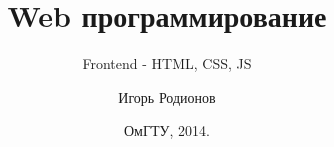 \documentclass[10pt]{beamer}
\title[Web]{Web программирование}
\subtitle[HTML, CSS, JS]{Frontend - HTML, CSS, JS}
\author[Родионов И.Н.]{Игорь Родионов}
\institute[ОмГТУ ИВТ]{Омский Государственный Технический Университет\\
	{\tiny кафедра Информатики и вычислительной техники}\\
}
\date[2013]{ОмГТУ, 2014.}
\begin{document}
\begin{frame}[plain]
\maketitle
\end{frame}








\end{document}
